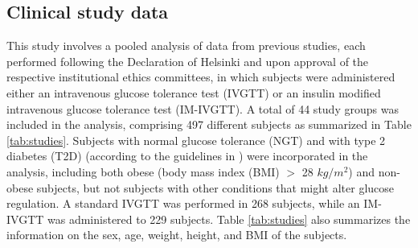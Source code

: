 \documentclass[utf8]{frontiersSCNS} %
\begin{document}
\subsection{Clinical study data}
This study involves a pooled analysis of data from previous studies, each performed following the Declaration of Helsinki and upon approval of the respective institutional ethics committees, in which subjects were administered either an intravenous glucose tolerance test (IVGTT) or an insulin modified intravenous glucose tolerance test (IM-IVGTT). A total of 44 study groups was included in the analysis, comprising 497 different subjects as summarized in Table \ref{tab:studies}. Subjects with normal glucose tolerance (NGT) and with type 2 diabetes (T2D) (according to the guidelines in \citet{t2dm_class}) were incorporated in the analysis, including both obese (body mass index (BMI) $>$ 28 $kg/m^2$) and non-obese subjects, but not subjects with other conditions that might alter glucose regulation. A standard IVGTT was performed in 268 subjects, while an IM-IVGTT was administered to 229 subjects. Table \ref{tab:studies} also summarizes the information on the sex, age, weight, height, and BMI of the subjects.
\end{document}
